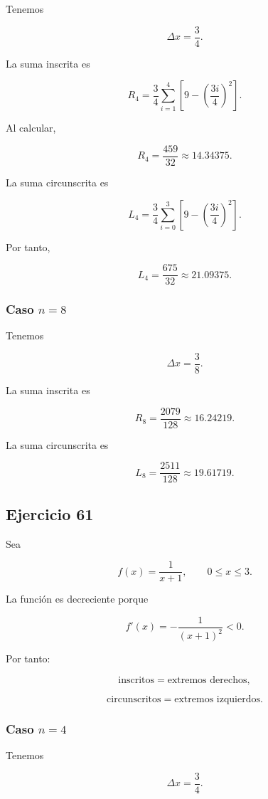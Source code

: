 \documentclass[12pt]{article}
\begin{document}
Tenemos

\[
\Delta x
=
\frac34.
\]

La suma inscrita es

\[
R_4
=
\frac34
\sum_{i=1}^{4}
\left[
9-
\left(\frac{3i}{4}\right)^2
\right].
\]

Al calcular,

\[
\boxed{
R_4=\frac{459}{32}\approx14.34375
}.
\]

La suma circunscrita es

\[
L_4
=
\frac34
\sum_{i=0}^{3}
\left[
9-
\left(\frac{3i}{4}\right)^2
\right].
\]

Por tanto,

\[
\boxed{
L_4=\frac{675}{32}\approx21.09375
}.
\]

\subsubsection*{Caso \(n=8\)}

Tenemos

\[
\Delta x
=
\frac38.
\]

La suma inscrita es

\[
\boxed{
R_8=
\frac{2079}{128}
\approx16.24219
}.
\]

La suma circunscrita es

\[
\boxed{
L_8=
\frac{2511}{128}
\approx19.61719
}.
\]

\subsection*{Ejercicio 61}

Sea

\[
f(x)=\frac{1}{x+1},
\qquad
0\leq x\leq3.
\]

La función es decreciente porque

\[
f'(x)
=
-\frac{1}{(x+1)^2}<0.
\]

Por tanto:

\[
\text{inscritos}=\text{extremos derechos},
\]

\[
\text{circunscritos}=\text{extremos izquierdos}.
\]

\subsubsection*{Caso \(n=4\)}

Tenemos

\[
\Delta x
=
\frac34.
\]
\end{document}
